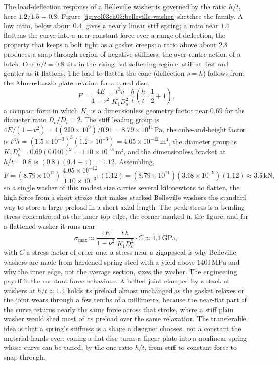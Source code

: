 The load-deflection response of a Belleville washer is governed by the
ratio $h/t$, here $1.2/1.5 = 0.8$. Figure
\ref{fig:vol03ch03:belleville-washer} sketches the family. A low ratio,
below about $0.4$, gives a nearly linear stiff spring; a ratio near $1.4$
flattens the curve into a near-constant force over a range of deflection,
the property that keeps a bolt tight as a gasket creeps; a ratio above
about $2.8$ produces a snap-through region of negative stiffness, the
over-centre action of a latch. Our $h/t = 0.8$ sits in the rising but
softening regime, stiff at first and gentler as it flattens. The load to
flatten the cone (deflection $s = h$) follows from the Almen-Laszlo plate
relation for a coned disc,
\[
F = \frac{4E}{1-\nu^2}\,\frac{t^3 h}{K_1 D_o^2}\,\frac{h}{t}\left(\frac{h}
{t}\cdot\frac{1}{2} + 1\right),
\]
a compact form in which $K_1$ is a dimensionless geometry factor near
$0.69$ for the diameter ratio $D_o/D_i = 2$. The stiff leading group is
$4E/(1-\nu^2) = 4(200\times 10^9)/0.91 = 8.79\times 10^{11}\,\text{Pa}$,
the cube-and-height factor is $t^3 h = (1.5\times 10^{-3})^3(1.2\times
10^{-3}) = 4.05\times 10^{-12}\,\si{\meter}^4$, the diameter group is
$K_1 D_o^2 = 0.69(0.040)^2 = 1.10\times 10^{-3}\,\si{\meter}^2$, and the
dimensionless bracket at $h/t = 0.8$ is $(0.8)(0.4 + 1) = 1.12$.
Assembling,
\[
F = (8.79\times 10^{11})\,\frac{4.05\times 10^{-12}}{1.10\times 10^{-3}}\,
(1.12) = (8.79\times 10^{11})(3.68\times 10^{-9})(1.12) \approx 3.6\,
\text{kN},
\]
so a single washer of this modest size carries several kilonewtons to
flatten, the high force from a short stroke that makes stacked Belleville
washers the standard way to store a large preload in a short axial length.
The peak stress is a bending stress concentrated at the inner top edge,
the corner marked in the figure, and for a flattened washer it runs near
\[
\sigma_{\max} \approx \frac{4E}{1-\nu^2}\,\frac{t\,h}{K_1 D_o^2}\cdot C
\approx 1.1\,\text{GPa},
\]
with $C$ a stress factor of order one; a stress near a gigapascal is why
Belleville washers are made from hardened spring steel with a yield above
$1400\,\text{MPa}$ and why the inner edge, not the average section, sizes
the washer. The engineering payoff is the constant-force behaviour. A
bolted joint clamped by a stack of washers at $h/t \approx 1.4$ holds its
preload almost unchanged as the gasket relaxes or the joint wears through a
few tenths of a millimetre, because the near-flat part of the curve
returns nearly the same force across that stroke, where a stiff plain
washer would shed most of its preload over the same relaxation. The
transferable idea is that a spring's stiffness is a shape a designer
chooses, not a constant the material hands over: coning a flat disc turns
a linear plate into a nonlinear spring whose curve can be tuned, by the one
ratio $h/t$, from stiff to constant-force to snap-through.

